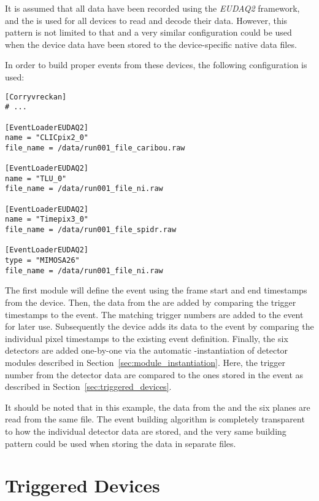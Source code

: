 It is assumed that all data have been recorded using the \emph{EUDAQ2} framework, and the  is used for all devices to read and decode their data.
However, this pattern is not limited to that and a very similar configuration could be used when the device data have been stored to the device-specific native data files.

In order to build proper events from these devices, the following configuration is used:

\begin{verbatim}
[Corryvreckan]
# ...

[EventLoaderEUDAQ2]
name = "CLICpix2_0"
file_name = /data/run001_file_caribou.raw

[EventLoaderEUDAQ2]
name = "TLU_0"
file_name = /data/run001_file_ni.raw

[EventLoaderEUDAQ2]
name = "Timepix3_0"
file_name = /data/run001_file_spidr.raw

[EventLoaderEUDAQ2]
type = "MIMOSA26"
file_name = /data/run001_file_ni.raw
\end{verbatim}

The first module will define the event using the frame start and end timestamps from the  device.
Then, the data from the  are added by comparing the trigger timestamps to the event.
The matching trigger numbers are added to the event for later use.
Subsequently the  device adds its data to the event by comparing the individual pixel timestamps to the existing event definition.
Finally, the six  detectors are added one-by-one via the automatic -instantiation of detector modules described in Section~\ref{sec:module_instantiation}.
Here, the trigger number from the detector data are compared to the ones stored in the event as described in Section~\ref{sec:triggered_devices}.

It should be noted that in this example, the data from the  and the six  planes are read from the same file.
The event building algorithm is completely transparent to how the individual detector data are stored, and the very same building pattern could be used when storing the data in separate files.

\section{Triggered Devices}

